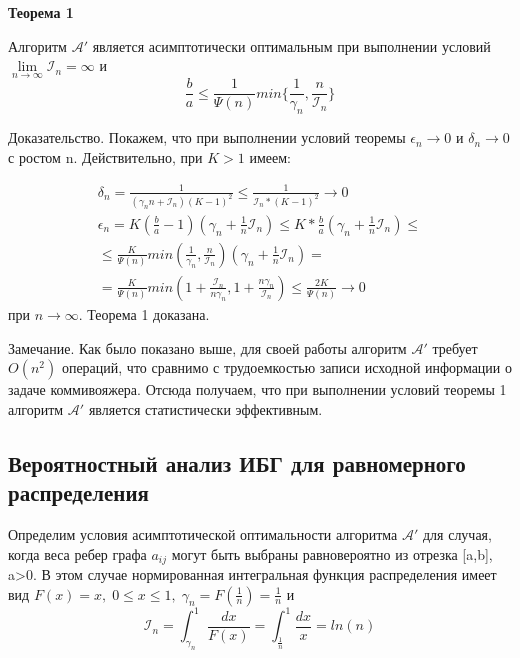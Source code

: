 \documentclass[a4paper, 14pt]{extarticle}
\numberwithin{equation}{section}
\begin{document}
\textbf{Теорема 1}

Алгоритм $\mathcal{A'}$ является асимптотически оптимальным при выполнении условий $\lim\limits_{{n} \to \infty} \mathcal{I}_n = \infty $ и 
\begin{equation}
\frac{b}{a} \leq \frac{1}{\Psi(n)} min \{ \frac{1}{\gamma_n}, \frac{n}{\mathcal{I}_n} \}
\end{equation}

Доказательство. Покажем, что при выполнении условий теоремы $\epsilon_n \to 0$ и $\delta_n \to 0$ с ростом n. Действительно, при $K>1$ имеем:

\begin{equation}
\begin{aligned}
\delta_n = \frac{1}{(\gamma_n n+\mathcal{I}_n)(K-1)^2} \leq \frac{1}{\mathcal{I}_n * (K-1)^2} \to 0 \\
\epsilon_n = K(\frac{b}{a}-1)(\gamma_n+\frac{1}{n} \mathcal{I}_n) \leq K*\frac{b}{a} (\gamma_n+\frac{1}{n} \mathcal{I}_n)\leq \\
\leq \frac{K}{\Psi(n)} min(\frac{1}{\gamma_n}, \frac{n}{\mathcal{I}_n})(\gamma_n+\frac{1}{n} \mathcal{I}_n) = \\
= \frac{K}{\Psi(n)} min (1+\frac{\mathcal{I}_n}{n \gamma_n}, 1+\frac{n \gamma_n}{\mathcal{I}_n}) \leq \frac{2K}{\Psi(n)} \to 0
\end{aligned}
\end{equation}
при $n \to \infty$. Теорема 1 доказана.

Замечание. Как было показано выше, для своей работы алгоритм $\mathcal{A'}$ требует $O(n^2)$ операций, что сравнимо с трудоемкостью записи исходной информации о задаче коммивояжера. Отсюда получаем, что при выполнении условий теоремы 1 алгоритм $\mathcal{A'}$ является статистически эффективным.\\


\subsection{Вероятностный анализ ИБГ для равномерного распределения}


Определим условия асимптотической оптимальности алгоритма $\mathcal{A'}$ для случая, когда веса ребер графа $a_{ij}$ могут быть выбраны равновероятно из отрезка [a,b], a>0. В этом случае нормированная интегральная функция распределения имеет вид $F(x) = x,\; 0 \leq x \leq 1,\; \gamma_n = F(\frac{1}{n}) = \frac{1}{n}$ и
\begin{equation}
\mathcal{I}_n = \int_{\gamma_n}^1 \frac{dx}{F(x)} = \int_{\frac{1}{n}}^1 \frac{dx}{x} = ln(n)
\end{equation}
\end{document}
